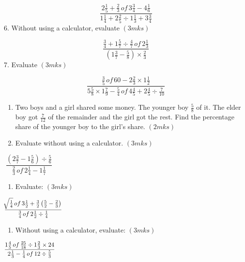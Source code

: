 \documentclass[
  letterpaper,
  DIV=11,
  numbers=noendperiod]{scrreprt}
\providecommand{\tightlist}{%
  \setlength{\itemsep}{0pt}\setlength{\parskip}{0pt}}\usepackage{longtable,booktabs,array}
\begin{document}
\begin{tcolorbox}
\[
\frac{2\frac{1}{5}+\frac{2}{3}\,of\,3\frac{3}{4}-4\frac{1}{6}}{1\frac{1}{4}+2\frac{2}{5}\div 1\frac{1}{3}+3\frac{3}{4}}  
\] 6. Without using a calculator, evaluate \hspace{11.5cm} \((3mks)\)

\[
\frac{\frac{3}{4}+1\frac{5}{7}\div \frac{4}{7}\,of\, 2\frac{1}{3}}{\left (1\frac{3}{7}-\frac{5}{8}\right)\times\frac{2}{3}}  
\] 7. Evaluate \hspace{9.5cm} \((3mks)\)

\[
\frac{\frac{3}{5}\,of\,60-2\frac{2}{3}\times1\frac{1}{2}}{5\frac{5}{8}\times1\frac{7}{9}-\frac{5}{4}\,of\,4\frac{4}{5}+2\frac{4}{5}\div\frac{7}{10}} 
\]

\begin{enumerate}
\def\labelenumi{\arabic{enumi}.}
\setcounter{enumi}{7}
\item
  Two boys and a girl shared some money. The younger boy \(\frac{5}{8}\)
  of it. The elder boy got \(\frac{7}{12}\) of the remainder and the
  girl got the rest. Find the percentage share of the younger boy to the
  girl's share. \hspace{13.2cm} \((2mks)\)
\item
  Evaluate without using a calculator. \((3mks)\)
\end{enumerate}

\[
\frac{\left( 2\frac{3}{7}-1\frac{5}{6}\right)\div\frac{5}{6}}{\frac{2}{3}\,of\,2\frac{1}{4}-1\frac{1}{7}} \hspace{12cm}
\]

\begin{enumerate}
\def\labelenumi{\arabic{enumi}.}
\setcounter{enumi}{9}
\tightlist
\item
  Evaluate: \((3mks)\)
\end{enumerate}

\[
\frac{\sqrt[]{\frac{1}{4}}\,of\,3\frac{1}{2}+\frac{3}{2}\left(\frac{5}{2}-\frac{2}{3}\right)}{\frac{3}{4}\,of\,2\frac{1}{2}\div\frac{1}{4}} \hspace{10.8cm} 
\]

\begin{enumerate}
\def\labelenumi{\arabic{enumi}.}
\setcounter{enumi}{10}
\tightlist
\item
  Without using a calculator, evaluate: \((3mks)\)
\end{enumerate}

\[
\frac{1\frac{4}{5}\,of\,\frac{25}{18}\div1\frac{2}{3}\times24}{2\frac{1}{3}-\frac{1}{4}\,of\,12\div\frac{5}{3}}  \hspace{11.2cm}    
\]


\end{tcolorbox}
\end{document}
